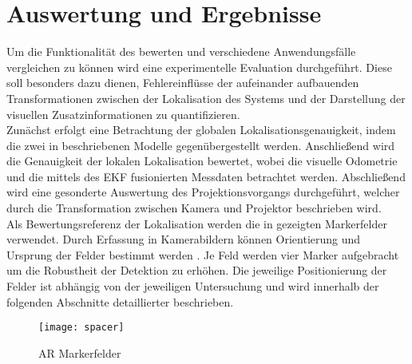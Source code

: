 \chapter{\red[Experimentelle ]Auswertung und Ergebnisse}
\label{chap.results}

Um die Funktionalität des  bewerten und verschiedene Anwendungsfälle vergleichen zu können wird eine experimentelle Evaluation durchgeführt. Diese soll besonders dazu dienen, Fehlereinflüsse der aufeinander aufbauenden Transformationen zwischen der Lokalisation des Systems und der Darstellung der visuellen Zusatzinformationen zu quantifizieren.\\

Zunächst erfolgt eine Betrachtung der globalen Lokalisationsgenauigkeit, indem die zwei in  beschriebenen Modelle gegenübergestellt werden. Anschließend wird die Genauigkeit der lokalen Lokalisation bewertet, wobei die visuelle Odometrie und die mittels des EKF fusionierten Messdaten betrachtet werden. Abschließend wird eine gesonderte Auswertung des Projektionsvorgangs durchgeführt, welcher durch die Transformation zwischen Kamera und Projektor beschrieben wird.\\

Als Bewertungsreferenz  der Lokalisation werden die in  gezeigten Markerfelder verwendet. Durch Erfassung in Kamerabildern können Orientierung und Ursprung der Felder bestimmt werden . Je Feld werden vier Marker aufgebracht um die Robustheit der Detektion zu erhöhen. Die jeweilige Positionierung der Felder ist abhängig von der jeweiligen Untersuchung und wird innerhalb der folgenden Abschnitte detaillierter beschrieben.\\

\begin{figure}[!ht]
	\begin{center}
		\texttt{[image: spacer]}
		\caption{AR Markerfelder}
		\label{fig.armarker}
	\end{center}
\end{figure}

